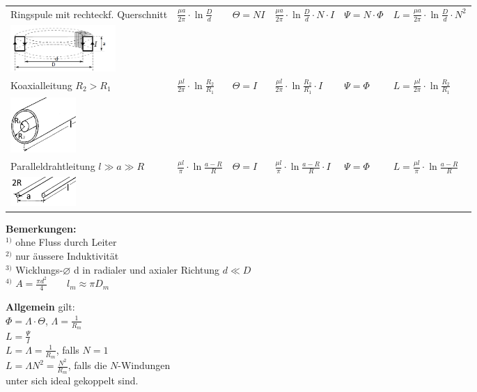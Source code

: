 \begin{tabular}{|p{5cm}|l|l|l|l|l|}
  \hline
  Ringspule mit rechteckf. Querschnitt & $\frac{\mu a}{2
  \pi}\cdot\ln\frac{D}{d}$ & $\Theta = NI$ & $\frac{\mu a}{2\pi}\cdot\ln\frac{D}{d}\cdot N \cdot I$ & $\Psi = N
  \cdot \Phi$ & $L=\frac{\mu a}{2\pi}\cdot\ln\frac{D}{d}\cdot N^2$\\
  \includegraphics[width=4cm]{./images/torus.png} & & & & & \\
  \hline
  Koaxialleitung $R_2 > R_1$
  & $\frac{\mu l}{2 \pi}\cdot\ln\frac{R_2}{R_1}$ & $\Theta = I$ & $\frac{\mu l}{2\pi}\cdot\ln\frac{R_2}{R_1}\cdot I$ & $\Psi = \Phi$ & $L=\frac{\mu l}{2\pi}\cdot\ln\frac{R_2}{R_1}$ \\
  \includegraphics[width=2.5cm]{./images/e-c-koaxialkabel.png} & & & & & \\
  \hline
  Paralleldrahtleitung $l \gg a \gg R$ & $\frac{\mu l}{\pi}\cdot\ln\frac{a-R}{R}$ & $\Theta = I$ & $\frac{\mu l}{\pi}\cdot\ln\frac{a-R}{R}\cdot I$ & $\Psi = \Phi$ & $L=\frac{\mu l}{\pi}\cdot\ln\frac{a-R}{R}$\\
  \includegraphics[width=2.5cm]{./images/e-c-paralleldraht.png} & & & & & \\
  \hline
\end{tabular}

\begin{multicols}{2}
	\textbf{Bemerkungen:}\\
	$^{1)}$ ohne Fluss durch Leiter\\
	$^{2)}$ nur äussere Induktivität\\
	$^{3)}$ Wicklungs-$\varnothing$ d in radialer und axialer Richtung $d \ll D$\\
	$^{4)}$ $A=\frac{\pi d^2}{4} \qquad l_m \approx \pi D_m$
	
	\columnbreak
	
	\textbf{Allgemein} gilt:\\
	$\Phi=\Lambda \cdot \Theta$, $\Lambda=\frac{1}{R_m}$\\
	$L=\frac{\Psi}{I}$\\
	$L=\Lambda=\frac{1}{R_m}$, falls $N=1$\\
	$L=\Lambda N^2=\frac{N^2}{R_m}$, falls die $N$-Windungen\\ unter sich ideal
	gekoppelt sind.
\end{multicols}

